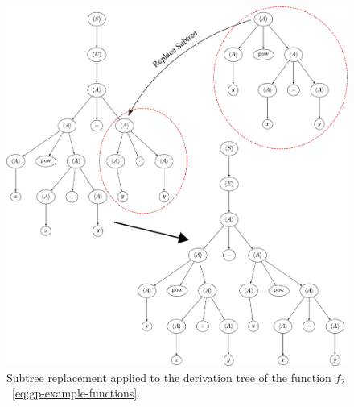 \begin{figure}
	\centering
	\includegraphics[scale=0.475]{figures/trees/subtree_mutation.pdf}
	\caption{Subtree replacement applied to the derivation tree of the function $f_2$~\eqref{eq:gp-example-functions}.}
	\label{fig:gp-replacement-mutation}
\end{figure}

